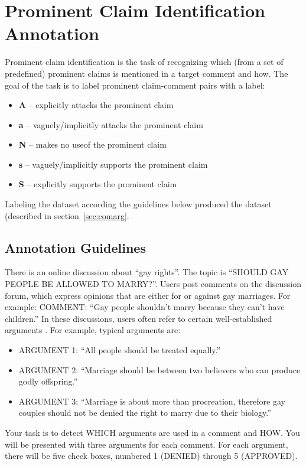 \section{Prominent Claim Identification Annotation}
\label{sec:argrec_annotation}

Prominent claim identification is the task of recognizing which (from a set of
predefined) prominent claims is mentioned in a target comment and how. The goal
of the task is to label prominent claim-comment pairs with a label:
\begin{itemize}
	\item \textbf{A} -- explicitly attacks the prominent claim
	\item \textbf{a} -- vaguely/implicitly attacks the prominent claim
	\item \textbf{N} -- makes no useof the prominent claim
	\item \textbf{s} -- vaguely/implicitly supports the prominent claim
	\item \textbf{S} -- explicitly supports the prominent claim
\end{itemize}
Labeling the dataset according the guidelines below
produced the \ComArg dataset (described in section~\ref{sec:comarg}.

\subsection{Annotation Guidelines}

There is an online discussion about ``gay rights''. The topic is ``SHOULD GAY
PEOPLE BE ALLOWED TO MARRY?''. Users post comments on the discussion forum,
which express opinions that are either for or against gay marriages. For
example: COMMENT: ``Gay people shouldn’t marry because they can’t have
children.''
In these discussions, users often refer to certain well-established arguments .
For example, typical arguments are:
\begin{itemize}
\item ARGUMENT 1: ``All people should be treated equally.''
\item ARGUMENT 2: ``Marriage should be between two believers who can produce godly offspring.''
\item ARGUMENT 3: ``Marriage is about more than procreation, therefore gay couples should not be denied the right to marry due to their biology.''
\end{itemize}

\noindent Your task is to detect WHICH arguments are used in a comment and HOW. You will
be presented with three arguments for each comment. For each argument, there
will be five check boxes, numbered 1 (DENIED) through 5 (APPROVED). 

